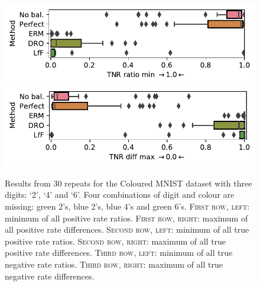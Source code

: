 \begin{figure}[htp]
  \includegraphics[width=0.8\columnwidth]{paper3/figures/cmnist_3dig_4miss_tnrr-min.pdf}
  \includegraphics[width=0.8\columnwidth]{paper3/figures/cmnist_3dig_4miss_tnrd-max.pdf}
  \caption{
    Results from 30 repeats for the Coloured MNIST dataset with three digits: `2', `4' and `6'.
    Four combinations of digit and colour are missing: {\color{green}green} 2's, {\color{blue}blue} 2's, {\color{blue}blue} 4's and {\color{green}green} 6's.
    \textsc{First row, left}: minimum of all positive rate ratios.
    \textsc{First row, right}: maximum of all positive rate differences.
    \textsc{Second row, left}: minimum of all true positive rate ratios.
    \textsc{Second row, right}: maximum of all true positive rate differences.
    \textsc{Third row, left}: minimum of all true negative rate ratios.
    \textsc{Third row, right}: maximum of all true negative rate differences.
  }%
  \label{fig:cmnist-3dig-4miss-add}
\end{figure}
